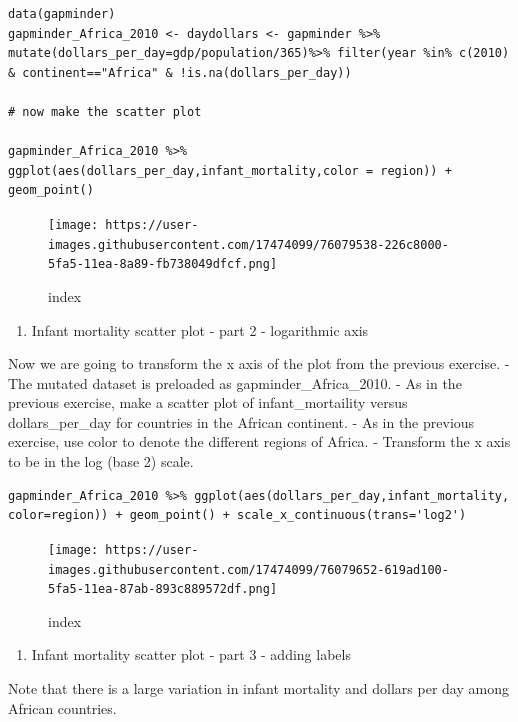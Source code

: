 \documentclass[
]{article}
\providecommand{\tightlist}{%
  \setlength{\itemsep}{0pt}\setlength{\parskip}{0pt}}
\begin{document}
\begin{verbatim}
data(gapminder)
gapminder_Africa_2010 <- daydollars <- gapminder %>% mutate(dollars_per_day=gdp/population/365)%>% filter(year %in% c(2010) & continent=="Africa" & !is.na(dollars_per_day))

# now make the scatter plot

gapminder_Africa_2010 %>% ggplot(aes(dollars_per_day,infant_mortality,color = region)) + geom_point()
\end{verbatim}

\begin{figure}
\centering
\texttt{[image: https://user-images.githubusercontent.com/17474099/76079538-226c8000-5fa5-11ea-8a89-fb738049dfcf.png]}
\caption{index}
\end{figure}

\begin{enumerate}
\def\labelenumi{\arabic{enumi}.}
\setcounter{enumi}{11}
\tightlist
\item
  Infant mortality scatter plot - part 2 - logarithmic axis
\end{enumerate}

Now we are going to transform the x axis of the plot from the previous
exercise. - The mutated dataset is preloaded as gapminder\_Africa\_2010.
- As in the previous exercise, make a scatter plot of infant\_mortaility
versus dollars\_per\_day for countries in the African continent. - As in
the previous exercise, use color to denote the different regions of
Africa. - Transform the x axis to be in the log (base 2) scale.

\begin{verbatim}
gapminder_Africa_2010 %>% ggplot(aes(dollars_per_day,infant_mortality, color=region)) + geom_point() + scale_x_continuous(trans='log2')
\end{verbatim}

\begin{figure}
\centering
\texttt{[image: https://user-images.githubusercontent.com/17474099/76079652-619ad100-5fa5-11ea-87ab-893c889572df.png]}
\caption{index}
\end{figure}

\begin{enumerate}
\def\labelenumi{\arabic{enumi}.}
\setcounter{enumi}{12}
\tightlist
\item
  Infant mortality scatter plot - part 3 - adding labels
\end{enumerate}

Note that there is a large variation in infant mortality and dollars per
day among African countries.
\end{document}
